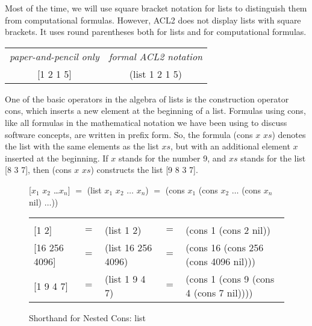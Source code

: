 \begin{aside}
Most of the time, we will use square bracket
notation for lists
to distinguish them from computational formulas.
However, ACL2 does not display lists with square brackets.
It uses round parentheses both for lists and for computational formulas.
\begin{center}
\vspace{1mm}
\begin{tabular}{cc}
 \emph{paper-and-pencil only} & \emph{formal ACL2 notation}\\
 \textsf{[1 2 1 5]}           & \textsf{(list 1 2 1 5)}\\
\end{tabular}
\end{center}
\caption{Square Bracket Notation for Lists: Paper-and-Pencil Only}
\label{square-bracket-notation}
\end{aside}

One of the basic operators in the algebra of lists is the
construction operator
\textsf{cons},
which inserts a new element at the beginning of a list.
Formulas using \textsf{cons}, like all formulas in
the mathematical notation we have been using to discuss software concepts,
are written in prefix form.
So, the formula \textsf{(cons $x$ $xs$)} denotes the list
with the same elements as the list $xs$,
but with an additional element $x$ inserted at the beginning.
If $x$ stands for the number 9,
and $xs$ stands for the list \textsf{[8 3 7]},
then \textsf{(cons $x$ $xs$)} constructs the list \textsf{[9 8 3 7]}.

\begin{figure}
\begin{center}
\vspace{1mm}
\textsf{[$x_1$ $x_2$ \dots $x_n$]} $=$
\textsf{(list $x_1$ $x_2$ $\dots$ $x_n$)} $=$ \textsf{(cons $x_1$ (cons $x_2$ $\dots$ (cons $x_n$ nil) $\dots$))}\\
\addtolength{\tabcolsep}{-4pt}
\begin{tabular}{lclcl}
\hline \\[-1.0em]
\textsf{{[1 2]}}         &$=$ &\textsf{(list 1 2)}        &$=$ &\textsf{(cons 1 (cons 2 nil))}\\
\textsf{{[16 256 4096]}} &$=$ &\textsf{(list 16 256 4096})&$=$ &\textsf{(cons 16 (cons 256 (cons 4096 nil)))}\\
\textsf{{[1 9 4 7]}}     &$=$ &\textsf{(list 1 9 4 7)}    &$=$ &\textsf{(cons 1 (cons 9 (cons 4 (cons 7 nil))))}\\
\end{tabular}
\addtolength{\tabcolsep}{4pt}
\end{center}
\caption{Shorthand for Nested Cons: \textsf{list}}
\label{fig:list-nested-cons}
\end{figure}

